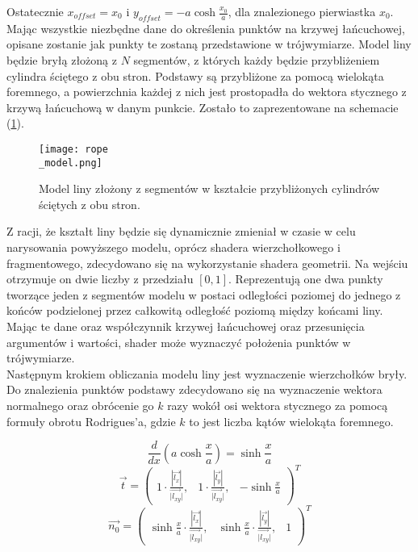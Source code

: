 Ostatecznie $x_{offset} = x_0$ i $y_{offset} = -a\cosh \frac{x_0}{a}$, dla znalezionego pierwiastka $x_0$.
\\

Mając wszystkie niezbędne dane do określenia punktów na krzywej łańcuchowej, opisane zostanie jak punkty te zostaną przedstawione w trójwymiarze. Model liny będzie bryłą złożoną z $N$ segmentów, z których każdy będzie przybliżeniem cylindra ściętego z obu stron. Podstawy są przybliżone za pomocą wielokąta foremnego, a powierzchnia każdej z nich jest prostopadła do wektora stycznego z krzywą łańcuchową w danym punkcie. Zostało to zaprezentowane na schemacie (\ref{rope_model}).
\\

\begin{figure}[h]
	\centering
	\texttt{[image: rope\\\_model.png]}
	\caption{Model liny złożony z segmentów w kształcie przybliżonych cylindrów ściętych z obu stron.}
	\label{rope_model}
\end{figure}

Z racji, że kształt liny będzie się dynamicznie zmieniał w czasie w celu narysowania powyższego modelu, oprócz shadera wierzchołkowego i fragmentowego, zdecydowano się na wykorzystanie shadera geometrii. Na wejściu otrzymuje on dwie liczby z przedziału $[0, 1]$. Reprezentują one dwa punkty tworzące jeden z segmentów modelu w postaci odległości poziomej do jednego z końców podzielonej przez całkowitą odległość poziomą między końcami liny. Mając te dane oraz współczynnik krzywej łańcuchowej oraz przesunięcia argumentów i wartości, shader może wyznaczyć położenia punktów w trójwymiarze. 
\\

Następnym krokiem obliczania modelu liny jest wyznaczenie wierzchołków bryły. Do znalezienia punktów podstawy zdecydowano się na wyznaczenie wektora normalnego oraz obrócenie go $k$ razy wokół osi wektora stycznego za pomocą formuły obrotu Rodrigues'a, gdzie $k$ to jest liczba kątów wielokąta foremnego. 

\begin{equation*}
	\frac{d}{dx} \left( a \cosh \frac{x}{a} \right) = \sinh \frac{x}{a}
\end{equation*}
\begin{equation*}
	\vec{t} =
	\begin{pmatrix}
		1 \cdot \frac{|\vec{l_x}|}{\vec{|l_{xy}}|}, &
		1 \cdot \frac{|\vec{l_y}|}{\vec{|l_{xy}}|}, &
		-\sinh\frac{x}{a}
	\end{pmatrix}^T
\end{equation*}
\begin{equation*}
	\vec{n_0} =
	\begin{pmatrix}
		\sinh \frac{x}{a} \cdot \frac{|\vec{l_x}|}{\vec{|l_{xy}}|}, &
		\sinh \frac{x}{a} \cdot \frac{|\vec{l_y}|}{\vec{|l_{xy}}|}, &
		1
	\end{pmatrix}^T
\end{equation*}

